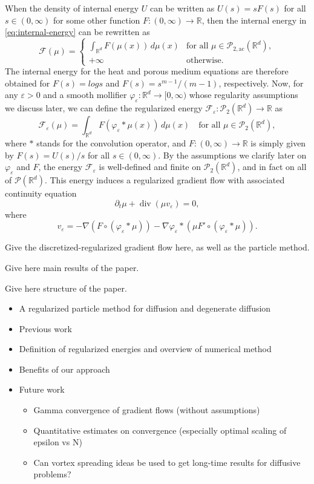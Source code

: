 \documentclass[11pt,leqno]{amsart}
\theoremstyle{definition}
\newcommand{\bes}{\begin{equation*}}
\newcommand{\ees}{\end{equation*}}
\newcommand{\comment}[1]{{\color{red}#1}} %
\newcommand{\R}{{\mathord{\mathbb R}}}
\newcommand{\grad}{\nabla}
\newcommand{\F}{\mathcal{F}}
\def\P{{\mathcal P}}
\def\Pac{\mathcal{P}_{\mathrm{2,ac}}}
\def\e{\varepsilon}
\def\F{\mathcal{F}}
\DeclareMathOperator{\dive}{div}
\begin{document}
When the density of internal energy $U$ can be written as $U(s)=sF(s)$ for all $s\in(0,\infty)$ for some other function $F\colon (0,\infty) \to \R$, then the internal energy in \eqref{eq:internal-energy} can be rewritten as
\bes
	\F(\mu) = \begin{cases}
		\displaystyle \int_{\R^d} F(\mu(x)) \,d\mu(x) & \mbox{for all $\mu \in \Pac(\R^d)$},\\
		+\infty & \mbox{otherwise}.
	\end{cases}
\ees
The internal energy for the heat and porous medium equations are therefore obtained for $F(s) = log s$ and $F(s) = s^{m-1}/(m-1)$, respectively. Now, for any $\e>0$ and a smooth mollifier $\varphi_\e \colon \R^d \to [0,\infty)$ whose regularity assumptions we discuss later, we can define the regularized energy $\F_\e \colon \P_2(\R^d) \to \R$ as
\bes
	\F_\e(\mu) = \int_{\R^d} F(\varphi_\e*\mu(x)) \,d\mu(x) \quad \mbox{for all $\mu\in \P_2(\R^d)$},
\ees
where $*$ stands for the convolution operator, and $F\colon (0,\infty) \to \R$ is simply given by $F(s) = U(s)/s$ for all $s\in(0,\infty)$. By the assumptions we clarify later on $\varphi_\e$ and $F$, the energy $\F_\e$ is well-defined and finite on $\P_2(\R^d)$, and in fact on all of $\P(\R^d)$. This energy induces a regularized gradient flow with associated continuity equation
\bes	
	\partial_t \mu + \dive \left( \mu v_\e \right) = 0,
\ees
where
\bes
	v_\e = - \grad \left(F\circ (\varphi_\e * \mu)\right) - \grad\varphi_\e * \left(\mu F'\circ(\varphi_\e*\mu)\right).
\ees

\comment{Give the discretized-regularized gradient flow here, as well as the particle method.}

\comment{Give here main results of the paper.}

\comment{Give here structure of the paper.}

\begin{itemize}
\item A regularized particle method for diffusion and degenerate diffusion
\item Previous work
\item Definition of regularized energies and overview of numerical method
\item Benefits of our approach
\item Future work
\begin{itemize}
\item Gamma convergence of gradient flows (without assumptions)
\item Quantitative estimates on convergence (especially optimal scaling of epsilon vs N)
\item Can vortex spreading ideas be used to get  long-time results for diffusive problems?
\end{itemize}
\end{itemize}
\end{document}

